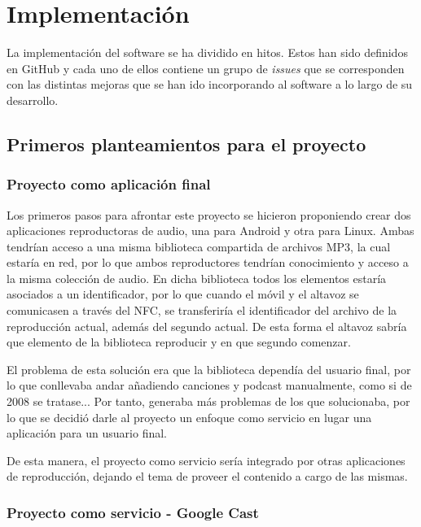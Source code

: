 \chapter{Implementación}

La implementación del software se ha dividido en hitos. Estos han sido definidos en GitHub
y cada uno de ellos contiene un grupo de \textit{issues} que se corresponden con las distintas
mejoras que se han ido incorporando al software a lo largo de su desarrollo.\\

\section{Primeros planteamientos para el proyecto}

\subsection{Proyecto como aplicación final}

Los primeros pasos para afrontar este proyecto se hicieron proponiendo crear dos
aplicaciones reproductoras de audio, una para Android y otra para Linux. Ambas
tendrían acceso a una misma biblioteca compartida de archivos MP3, la cual
estaría en red, por lo que ambos reproductores tendrían conocimiento y acceso a
la misma colección de audio. En dicha biblioteca todos los elementos estaría
asociados a un identificador, por lo que cuando el móvil y el altavoz se
comunicasen a través del NFC, se transferiría el identificador del archivo de la
reproducción actual, además del segundo actual. De esta forma el altavoz sabría
que elemento de la biblioteca reproducir y en que segundo comenzar.

El problema de esta solución era que la biblioteca dependía del usuario final,
por lo que conllevaba andar añadiendo canciones y podcast manualmente, como si
de 2008 se tratase... Por tanto, generaba más problemas de los que solucionaba,
por lo que se decidió darle al proyecto un enfoque como servicio en lugar una
aplicación para un usuario final.

De esta manera, el proyecto como servicio sería integrado por otras aplicaciones
de reproducción, dejando el tema de proveer el contenido a cargo de las mismas.

\subsection{Proyecto como servicio - Google Cast}

